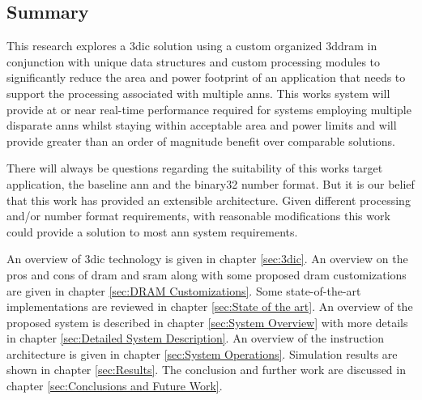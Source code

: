 \subsection[Summary]{Summary}
\label{sec:Summary}

This research explores a \ac{3dic} solution using a custom organized \ac{3ddram} in conjunction with unique data structures and custom processing modules to significantly reduce the 
area and power footprint of an application that needs to support the processing associated with multiple \ac{ann}s.
This works system will provide at or near real-time performance required for systems employing multiple disparate \ac{ann}s whilst staying within acceptable area and power limits and will provide greater than an order of magnitude benefit over comparable solutions.

There will always be questions regarding the suitability of this works target application, the baseline \ac{ann} and the \ac{binary32} number format.
But it is our belief that this work has provided an extensible architecture.
Given different processing and/or number format requirements, with reasonable modifications this work could provide a solution to most \ac{ann} system requirements.

\hfill %

An overview of \ac{3dic} technology is given in chapter \ref{sec:3dic}.
An overview on the pros and cons of \ac{dram} and \ac{sram} along with some proposed \ac{dram} customizations are given in chapter \ref{sec:DRAM Customizations}.
Some state-of-the-art implementations are reviewed in chapter \ref{sec:State of the art}.
An overview of the proposed system is described in chapter \ref{sec:System Overview} with more details in chapter \ref{sec:Detailed System Description}.
An overview of the instruction architecture is given in chapter \ref{sec:System Operations}.
Simulation results are shown in chapter \ref{sec:Results}.
The conclusion and further work are discussed in chapter \ref{sec:Conclusions and Future Work}.
